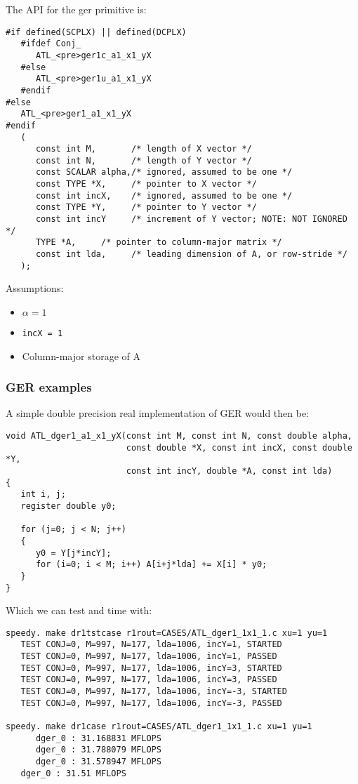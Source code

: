 \documentclass[11pt]{article}
\begin{document}
{The API for the ger primitive is:
\begin{verbatim}
#if defined(SCPLX) || defined(DCPLX)
   #ifdef Conj_
      ATL_<pre>ger1c_a1_x1_yX
   #else
      ATL_<pre>ger1u_a1_x1_yX
   #endif
#else
   ATL_<pre>ger1_a1_x1_yX
#endif
   (
      const int M,       /* length of X vector */
      const int N,       /* length of Y vector */
      const SCALAR alpha,/* ignored, assumed to be one */
      const TYPE *X,     /* pointer to X vector */
      const int incX,    /* ignored, assumed to be one */
      const TYPE *Y,     /* pointer to Y vector */
      const int incY     /* increment of Y vector; NOTE: NOT IGNORED */
      TYPE *A,     /* pointer to column-major matrix */
      const int lda,     /* leading dimension of A, or row-stride */
   );
\end{verbatim}

Assumptions:
\begin{itemize}
 \item $\alpha = 1$
 \item \verb+incX = 1+
 \item Column-major storage of A
\end{itemize}

\subsubsection{GER examples}

A simple double precision real implementation of GER would then be:
\begin{verbatim}
void ATL_dger1_a1_x1_yX(const int M, const int N, const double alpha,
                        const double *X, const int incX, const double *Y,
                        const int incY, double *A, const int lda)
{
   int i, j;
   register double y0;

   for (j=0; j < N; j++)
   {
      y0 = Y[j*incY];
      for (i=0; i < M; i++) A[i+j*lda] += X[i] * y0;
   }
}
\end{verbatim}
Which we can test and time with:
\begin{verbatim}
speedy. make dr1tstcase r1rout=CASES/ATL_dger1_1x1_1.c xu=1 yu=1
   TEST CONJ=0, M=997, N=177, lda=1006, incY=1, STARTED
   TEST CONJ=0, M=997, N=177, lda=1006, incY=1, PASSED
   TEST CONJ=0, M=997, N=177, lda=1006, incY=3, STARTED
   TEST CONJ=0, M=997, N=177, lda=1006, incY=3, PASSED
   TEST CONJ=0, M=997, N=177, lda=1006, incY=-3, STARTED
   TEST CONJ=0, M=997, N=177, lda=1006, incY=-3, PASSED

speedy. make dr1case r1rout=CASES/ATL_dger1_1x1_1.c xu=1 yu=1
      dger_0 : 31.168831 MFLOPS
      dger_0 : 31.788079 MFLOPS
      dger_0 : 31.578947 MFLOPS
   dger_0 : 31.51 MFLOPS
\end{verbatim}

}
\end{document}
